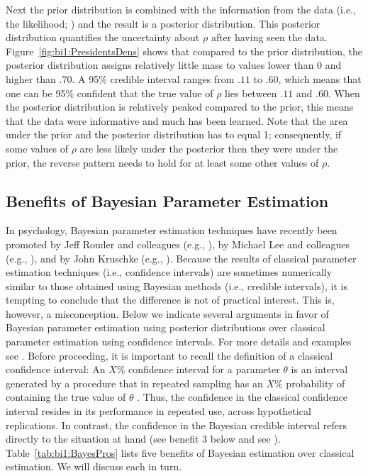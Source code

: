 Next the prior distribution is combined with the information from the data (i.e., the likelihood; ) and the result is a posterior distribution. This posterior distribution quantifies the uncertainty about $\rho$ after having seen the data. Figure~\ref{fig:bi1:PresidentsDens} shows that compared to the prior distribution, the posterior distribution assigns relatively little mass to values lower than 0 and higher than $.70$. A 95\% credible interval ranges from $.11$ to $.60$, which means that one can be 95\% confident that the true value of $\rho$ lies between $.11$ and $.60$. When the posterior distribution is relatively peaked compared to the prior, this means that the data were informative and much has been learned. Note that the area under the prior and the posterior distribution has to equal 1; consequently, if some values of $\rho$ are less likely under the posterior then they were under the prior, the reverse pattern needs to hold for at least some other values of $\rho$.

\subsection{Benefits of Bayesian Parameter Estimation}
In psychology, Bayesian parameter estimation techniques have recently been promoted by Jeff Rouder and colleagues (e.g., ), by Michael Lee and colleagues (e.g., ), and by John Kruschke (e.g., ). Because the results of classical parameter estimation techniques (i.e., confidence intervals) are sometimes numerically similar to those obtained using Bayesian methods (i.e., credible intervals), it is tempting to conclude that the difference is not of practical interest. This is, however, a misconception. Below we indicate several arguments in favor of Bayesian parameter estimation using posterior distributions over classical parameter estimation using confidence intervals. For more details and examples see . Before proceeding, it is important to recall the definition of a classical confidence interval: An $X\%$ confidence interval for a parameter $\theta$ is an interval generated by a procedure that in repeated sampling has an $X\%$ probability of containing the true value of $\theta$ \cite{HoekstraEtAl2014,Neyman1937}. Thus, the confidence in the classical confidence interval resides in its performance in repeated use, across hypothetical replications. In contrast, the confidence in the Bayesian credible interval refers directly to the situation at hand (see benefit 3 below and see ). Table~\ref{tab:bi1:BayesPros} lists five benefits of Bayesian estimation over classical estimation. We will discuss each in turn.

